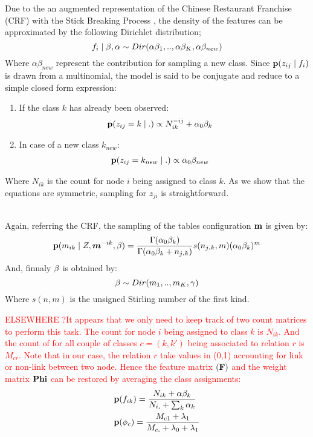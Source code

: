 Due to the an augmented representation of the Chinese Restaurant Franchise (CRF) with the Stick Breaking Process \cite{HDP}, the density of the features can be approximated by the following Dirichlet distribution;
\begin{equation}
f_i \mid \mathbf{\beta}, \alpha \sim Dir(\alpha \beta_1,..,\alpha\beta_K, \alpha\beta_{new})
\end{equation}
Where $\alpha\beta_{new}$ represent the contribution for sampling a new class. Since $\mathbf{p}(z_{ij} \mid f_i)$ is drawn from a multinomial, the model is said to be conjugate and reduce to a simple closed form expression:
\begin{enumerate}
\item If the class $k$ has already been observed:
   \begin{align}
    \pr(z_{ij} =k \mid .) &\propto N_{ik}^{-ij} + \alpha_0 \beta_k
    \label{eq:update-immsb}
   \end{align}
\item In case of a new class $k_{new}$:
   \begin{align}
    \mathbf{p}(z_{ij} =k_{new} \mid.) &\propto \alpha_0 \beta_{new} \nonumber   
   \end{align}
\end{enumerate}
 Where  $N_{ik}$ is the count for node $i$ being assigned to class $k$. As we show that the equations are symmetric, sampling for $z_{ji}$ is straightforward.

~\\
Again, referring the CRF, the sampling of the tables configuration $\mathbf{m}$ is given by: 
\begin{equation}
\mathbf{p}(m_{ik} \mid Z, \bm{m}^{-ik}, \mathbf{\beta} ) = \frac{\Gamma(\alpha_0 \beta_k)}{\Gamma(\alpha_0 \beta_k + n_{j\bm{.   }k})} s(n_{j\bm{.}k}, m) (\alpha_0 \beta_k)^m
\end{equation}
And, finnaly  $\mathbf{\beta}$ is obtained by:
\begin{equation}
\mathbf{\beta} \sim Dir(m_1,.., m_K, \gamma)  
\end{equation}
Where $s(n,m)$ is the unsigned Stirling number of the first kind.



\textcolor{red}{ELSEWHERE ?It appears that we only need to keep track of two count matrices to perform this task. The count for node $i$ being assigned to class $k$ is $N_{ik}$. And the count of for all couple of classes $c=(k,k')$ being associated to relation $r$ is $M_{cr}$. Note that in our case, the relation $r$ take values in (0,1) accounting for link or non-link between two node. Hence the feature matrix $\mathbf{(F)}$ and the weight matrix $\mathbf{Phi}$ can be restored by averaging the class assignments:
\begin{align}
&\mathbf{p}(f_{ik}) =\frac{ N_{ik} + \alpha\beta_k}{ N_{i\bm{.}} + \sum_k\alpha_k }\\
&\mathbf{p}(\phi_c ) = \frac{M_{c1} + \lambda_1}{M_{c\bm{.}} + \lambda_0 + \lambda_1}
\end{align}
}
